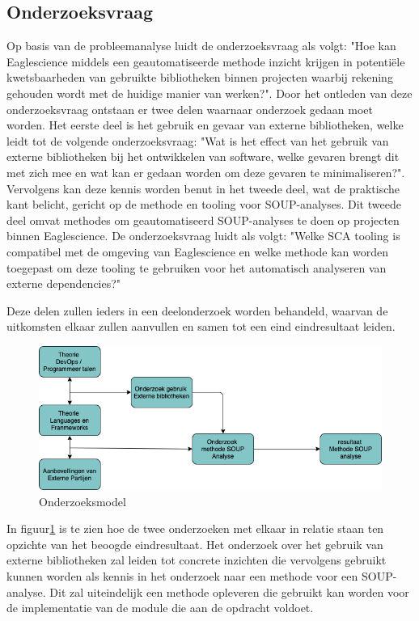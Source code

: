 \subsection{Onderzoeksvraag}\label{subsec:onderzoeksvraag-en-deelvragen}
Op basis van de probleemanalyse luidt de onderzoeksvraag als volgt: "Hoe kan Eaglescience middels een geautomatiseerde methode inzicht krijgen in potentiële kwetsbaarheden van gebruikte bibliotheken binnen projecten waarbij rekening gehouden wordt met de huidige manier van werken?". Door het ontleden van deze onderzoeksvraag ontstaan er twee delen waarnaar onderzoek gedaan moet worden. Het eerste deel is het gebruik en gevaar van externe bibliotheken, welke leidt tot de volgende onderzoeksvraag: "Wat is het effect van het gebruik van externe bibliotheken bij het ontwikkelen van software, welke gevaren brengt dit met zich mee en wat kan er gedaan worden om deze gevaren te minimaliseren?". Vervolgens kan deze kennis worden benut in het tweede deel, wat de praktische kant belicht, gericht op de methode en tooling voor SOUP-analyses. Dit tweede deel omvat methodes om geautomatiseerd SOUP-analyses te doen op projecten binnen Eaglescience. De onderzoeksvraag luidt als volgt: "Welke SCA tooling is compatibel met de omgeving van Eaglescience en welke methode kan worden toegepast om deze tooling te gebruiken voor het automatisch analyseren van externe dependencies?"

Deze delen zullen ieders in een deelonderzoek worden behandeld, waarvan de uitkomsten elkaar zullen aanvullen en samen tot een eind eindresultaat leiden.
\begin{figure}
    \myfloatalign
    \includegraphics[width=12cm]{gfx/Onderzoekmodel}
    \caption{Onderzoeksmodel}
    \label{fig:OnderzoeksModel}
\end{figure}

In figuur\ref{fig:OnderzoeksModel} is te zien hoe de twee onderzoeken met elkaar in relatie staan ten opzichte van het beoogde eindresultaat. Het onderzoek over het gebruik van externe bibliotheken zal leiden tot concrete inzichten die vervolgens gebruikt kunnen worden als kennis in het onderzoek naar een methode voor een SOUP-analyse. Dit zal uiteindelijk een methode opleveren die gebruikt kan worden voor de implementatie van de module die aan de opdracht voldoet.


